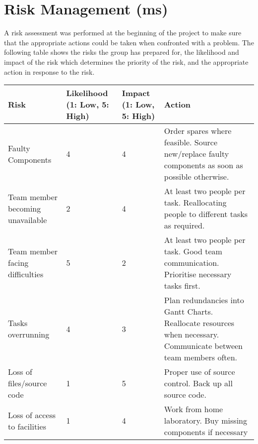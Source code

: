 \section{Risk Management (ms)}

A risk assessment was performed at the beginning of the project to make sure that the appropriate actions could be taken when confronted with a problem. 
The following table shows the risks the group has prepared for, the likelihood and 
impact of the risk which determines the priority of the risk, and the appropriate action in response to the risk.

\begin{center}
	\begin{tabular}{ | p{4cm} | p{2cm} | p{2cm} | p{5cm} | }
	\hline
	\textbf{Risk} & \textbf{Likelihood (1: Low, 5: High)} & 
	\textbf{Impact (1: Low, 5: High)} & \textbf{Action} \\ \hline
	Faulty Components & 4 & 4 & Order spares where feasible.
	Source new/replace faulty components as soon as possible otherwise. \\ \hline
	Team member becoming unavailable & 2 & 4 & At least two people per task.
	Reallocating people to different tasks as required. \\ \hline
	Team member facing difficulties & 5 & 2 & At least two people per task.
	Good team communication. Prioritise necessary tasks first. \\ \hline
	Tasks overrunning & 4 & 3 & Plan redundancies into Gantt Charts.
	Reallocate resources when necessary. Communicate between team members often. \\ \hline
	Loss of files/source code & 1 & 5 & Proper use of source control. Back up all source code. \\ \hline
	Loss of access to facilities & 1 & 4 & Work from home laboratory. 
	Buy missing components if necessary \\
	\hline
	\end{tabular}
\end{center}

